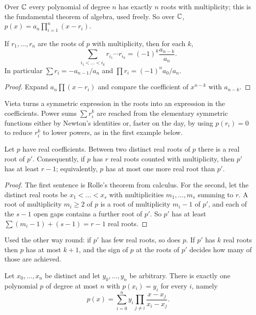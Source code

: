 Over $\mathbb{C}$ every polynomial of degree $n$ has exactly $n$ roots with multiplicity; this is the fundamental theorem of algebra, used freely. So over $\mathbb{C}$, $p(x) = a_n \prod_{i=1}^{n} (x - r_i)$.

\begin{theorem}[Vieta]
If $r_1, \dots, r_n$ are the roots of $p$ with multiplicity, then for each $k$,
\[
\sum_{i_1 < \dots < i_k} r_{i_1} \cdots r_{i_k} = (-1)^k \frac{a_{n-k}}{a_n} .
\]
In particular $\sum r_i = -a_{n-1}/a_n$ and $\prod r_i = (-1)^n a_0 / a_n$.
\end{theorem}

\begin{proof}
Expand $a_n \prod (x - r_i)$ and compare the coefficient of $x^{n-k}$ with $a_{n-k}$.
\end{proof}

Vieta turns a symmetric expression in the roots into an expression in the coefficients. Power sums $\sum r_i^k$ are reached from the elementary symmetric functions either by Newton's identities or, faster on the day, by using $p(r_i) = 0$ to reduce $r_i^k$ to lower powers, as in the first example below.

\begin{theorem}
Let $p$ have real coefficients. Between two distinct real roots of $p$ there is a real root of $p'$. Consequently, if $p$ has $r$ real roots counted with multiplicity, then $p'$ has at least $r - 1$; equivalently, $p$ has at most one more real root than $p'$.
\end{theorem}

\begin{proof}
The first sentence is Rolle's theorem from calculus. For the second, let the distinct real roots be $x_1 < \dots < x_s$ with multiplicities $m_1, \dots, m_s$ summing to $r$. A root of multiplicity $m_i \ge 2$ of $p$ is a root of multiplicity $m_i - 1$ of $p'$, and each of the $s - 1$ open gaps contains a further root of $p'$. So $p'$ has at least $\sum (m_i - 1) + (s - 1) = r - 1$ real roots.
\end{proof}

Used the other way round: if $p'$ has few real roots, so does $p$. If $p'$ has $k$ real roots then $p$ has at most $k + 1$, and the sign of $p$ at the roots of $p'$ decides how many of those are achieved.

\begin{theorem}
Let $x_0, \dots, x_n$ be distinct and let $y_0, \dots, y_n$ be arbitrary. There is exactly one polynomial $p$ of degree at most $n$ with $p(x_i) = y_i$ for every $i$, namely
\[
p(x) = \sum_{i=0}^{n} y_i \prod_{j \ne i} \frac{x - x_j}{x_i - x_j} .
\]
\end{theorem}

